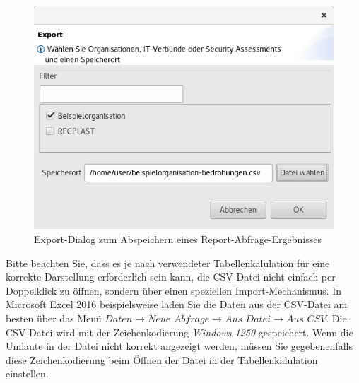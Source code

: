\documentclass[a4paper,10pt]{book}
\begin{document}
\begin{figure}[htb!]
  \centering
  \includegraphics[width=\linewidth]{Screenshot/query-editor-export-dialog-de.png}
  \caption{Export-Dialog zum Abspeichern eines Report-Abfrage-Ergebnisses}
  \label{fig:export-dialog-zum-abspeichern-eines-report-abfrage-ergebnisses}
\end{figure}

Bitte beachten Sie, dass es je nach verwendeter Tabellenkalulation für eine
korrekte Darstellung erforderlich sein kann, die CSV-Datei nicht einfach per
Doppelklick zu öffnen, sondern über einen speziellen Import-Mechanismus. In
Microsoft Excel 2016 beispielsweise laden Sie die Daten aus der CSV-Datei am
besten über das Menü $\textit{Daten}\to\textit{Neue Abfrage}\to\textit{Aus
Datei}\to\textit{Aus CSV}$. Die CSV-Datei wird mit der Zeichenkodierung \textit{Windows-1250}
gespeichert. Wenn die Umlaute in der Datei nicht korrekt angezeigt werden, müssen
Sie gegebenenfalls diese Zeichenkodierung beim Öffnen der Datei in der
Tabellenkalulation einstellen.
\end{document}
